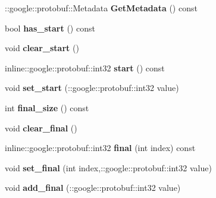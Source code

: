 \begin{DoxyCompactItemize}
\item 
\hypertarget{classlattice_1_1Lattice_a5982fde714e8610703e4528bb3584417}{
::google::protobuf::Metadata {\bfseries GetMetadata} () const }
\label{classlattice_1_1Lattice_a5982fde714e8610703e4528bb3584417}

\item 
\hypertarget{classlattice_1_1Lattice_a3a06d03c8fc2d4810946301eb851d9bd}{
bool {\bfseries has\_\-start} () const }
\label{classlattice_1_1Lattice_a3a06d03c8fc2d4810946301eb851d9bd}

\item 
\hypertarget{classlattice_1_1Lattice_a8a22bdebf8702ccd1d7221acdd9447f9}{
void {\bfseries clear\_\-start} ()}
\label{classlattice_1_1Lattice_a8a22bdebf8702ccd1d7221acdd9447f9}

\item 
\hypertarget{classlattice_1_1Lattice_aa736b2c11a852db4859bb421de1b9d5b}{
inline::google::protobuf::int32 {\bfseries start} () const }
\label{classlattice_1_1Lattice_aa736b2c11a852db4859bb421de1b9d5b}

\item 
\hypertarget{classlattice_1_1Lattice_aeff8a9022b4341221a2fb81c0da4958c}{
void {\bfseries set\_\-start} (::google::protobuf::int32 value)}
\label{classlattice_1_1Lattice_aeff8a9022b4341221a2fb81c0da4958c}

\item 
\hypertarget{classlattice_1_1Lattice_acce3e8812b8edc5fee61a1c07144e35c}{
int {\bfseries final\_\-size} () const }
\label{classlattice_1_1Lattice_acce3e8812b8edc5fee61a1c07144e35c}

\item 
\hypertarget{classlattice_1_1Lattice_a796495494bd3460afe3a3da75d9a9866}{
void {\bfseries clear\_\-final} ()}
\label{classlattice_1_1Lattice_a796495494bd3460afe3a3da75d9a9866}

\item 
\hypertarget{classlattice_1_1Lattice_a047eb8b2fdf3ba5b0f34b175084d4957}{
inline::google::protobuf::int32 {\bfseries final} (int index) const }
\label{classlattice_1_1Lattice_a047eb8b2fdf3ba5b0f34b175084d4957}

\item 
\hypertarget{classlattice_1_1Lattice_afd8033a01d6390099a2a25033e38302f}{
void {\bfseries set\_\-final} (int index,::google::protobuf::int32 value)}
\label{classlattice_1_1Lattice_afd8033a01d6390099a2a25033e38302f}

\item 
\hypertarget{classlattice_1_1Lattice_a8b9c4979ec846fb10419fd0a776e2bf6}{
void {\bfseries add\_\-final} (::google::protobuf::int32 value)}
\label{classlattice_1_1Lattice_a8b9c4979ec846fb10419fd0a776e2bf6}


\end{DoxyCompactItemize}
